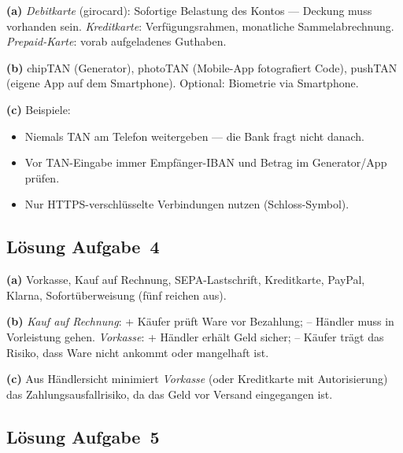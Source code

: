 \documentclass[11pt, a4paper]{article}
\begin{document}
\begin{loesung}
\textbf{(a)} \emph{Debitkarte} (girocard): Sofortige Belastung des Kontos --- Deckung
muss vorhanden sein. \emph{Kreditkarte}: Verfügungsrahmen, monatliche Sammelabrechnung.
\emph{Prepaid-Karte}: vorab aufgeladenes Guthaben.

\textbf{(b)} chipTAN (Generator), photoTAN (Mobile-App fotografiert Code), pushTAN
(eigene App auf dem Smartphone). Optional: Biometrie via Smartphone.

\textbf{(c)} Beispiele:
\begin{itemize}[itemsep=0pt]
  \item Niemals TAN am Telefon weitergeben --- die Bank fragt nicht danach.
  \item Vor TAN-Eingabe immer Empfänger-IBAN und Betrag im Generator/App prüfen.
  \item Nur HTTPS-verschlüsselte Verbindungen nutzen (Schloss-Symbol).
\end{itemize}
\end{loesung}

\subsection*{Lösung Aufgabe~4}

\begin{loesung}
\textbf{(a)} Vorkasse, Kauf auf Rechnung, SEPA-Lastschrift, Kreditkarte, PayPal, Klarna,
Sofortüberweisung (fünf reichen aus).

\textbf{(b)} \emph{Kauf auf Rechnung}: + Käufer prüft Ware vor Bezahlung; -- Händler
muss in Vorleistung gehen. \emph{Vorkasse}: + Händler erhält Geld sicher; -- Käufer
trägt das Risiko, dass Ware nicht ankommt oder mangelhaft ist.

\textbf{(c)} Aus Händlersicht minimiert \emph{Vorkasse} (oder Kreditkarte mit
Autorisierung) das Zahlungsausfallrisiko, da das Geld vor Versand eingegangen ist.
\end{loesung}

\subsection*{Lösung Aufgabe~5}
\end{document}
